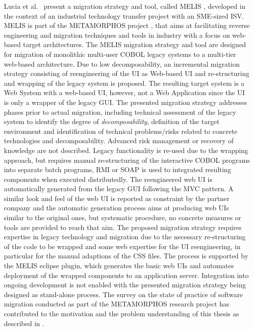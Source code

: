 Lucia et al.~\autocite{Lucia2008,Lucia2006} present a migration strategy and tool, called MELIS \autocite{Colosimo2007ControlledExperiments}, developed in the context of an industrial technology transfer project with an SME-sized ISV.
MELIS is part of the METAMORPHOS project \autocite{Lucia2009METAMORPHOS}, that aims at facilitating reverse engineering and migration techniques and tools in industry with a focus on web-based target architectures.
The MELIS migration strategy and tool are designed for migration of monolithic multi-user COBOL legacy systems to a multi-tier web-based architecture.
Due to low decomposability, an incremental migration strategy consisting of reengineering of the UI as Web-based UI and re-structuring and wrapping of the legacy system is proposed.
The resulting target system is a Web System with a web-based UI, however, not a Web Application since the UI is only a wrapper of the legacy GUI.
The presented migration strategy addresses phases prior to actual migration, including technical assessment of the legacy system to identify the degree of \emph{decomposability}, definition of the target environment and identification of technical problems/risks related to concrete technologies and decomposability.
Advanced risk management or recovery of knowledge are not described.
Legacy functionality is re-used due to the wrapping approach, but requires manual re-structuring of the interactive COBOL programs into separate batch programs, RMI or SOAP is used to integrated resulting components when executed distributedly.
The reengineered web UI is automatically generated from the legacy GUI following the MVC pattern.
A similar look and feel of the web UI is reported as constraint by the partner company and the automatic generation process aims at producing web UIs similar to the original ones, but systematic procedure, no concrete measures or tools are provided to reach that aim.
The proposed migration strategy requires expertise in legacy technology and migration due to the necessary re-structuring of the code to be wrapped and some web expertise for the UI reengineering, in particular for the manual adaptions of the CSS files.
The process is supported by the MELIS eclipse plugin, which generates the basic web UIs and automates deployment of the wrapped components to an application server.
Integration into ongoing development is not enabled with the presented migration strategy being designed as stand-alone process.
The survey on the state of practice of software migration \autocite{Torchiano2008ItalianSurvey} conducted as part of the METAMORPHOS research project \autocite{Lucia2009METAMORPHOS} has contributed to the motivation and the problem understanding of this thesis as described in .

